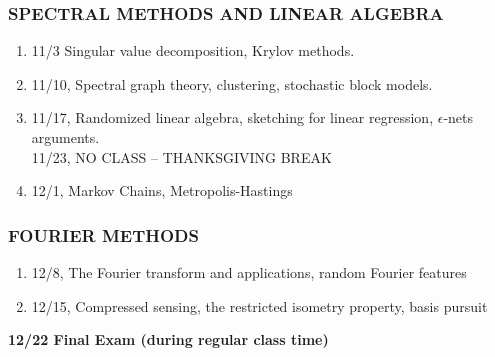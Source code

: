 \documentclass[10pt]{article}
\begin{document}
\subsubsection{SPECTRAL METHODS AND LINEAR ALGEBRA}
\begin{enumerate}\itemsep0em 
\setcounter{enumi}{8}
\item 11/3 Singular value decomposition, Krylov methods.
\item 11/10, Spectral graph theory, clustering, stochastic block models.	
\item 11/17, Randomized linear algebra, sketching for linear regression, $\epsilon$-nets arguments.\vspace{.5em}\\ 
11/23, NO CLASS -- THANKSGIVING BREAK
\item 12/1, Markov Chains, Metropolis-Hastings
\end{enumerate}

\subsubsection{FOURIER METHODS}
\begin{enumerate}\itemsep0em 
	\setcounter{enumi}{11}
	\item 12/8, The Fourier transform and applications, random Fourier features
	\item 12/15, Compressed sensing, the restricted isometry property, basis pursuit		
\end{enumerate}

\begin{center}\textbf{12/22 Final Exam (during regular class time)}\end{center}
\end{document}
